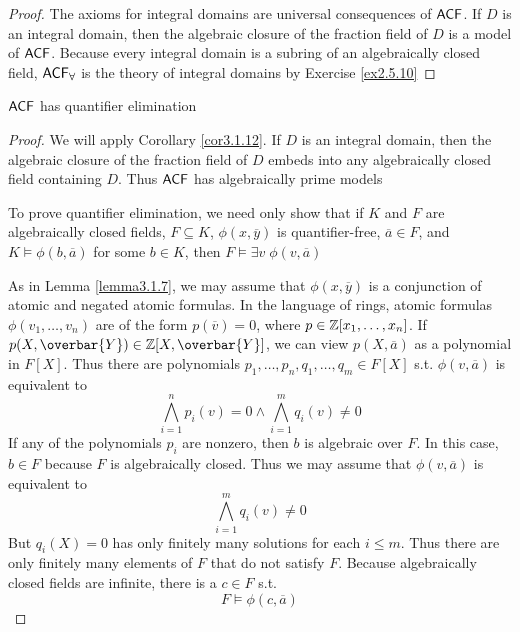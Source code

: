 \documentclass[11pt]{article}
\begin{document}
\begin{proof}
The axioms for integral domains are universal consequences of \(\textsf{ACF}\). If \(D\)
is an integral domain, then the algebraic closure of the fraction field of
\(D\) is a model of \(\textsf{ACF}\). Because every integral domain is a subring of an
algebraically closed field, \(\textsf{ACF}_\forall\) is the theory of integral
domains by Exercise \ref{ex2.5.10}
\end{proof}

\begin{theorem}[]
\label{thm3.2.2}
\(\textsf{ACF}\) has quantifier elimination
\end{theorem}

\begin{proof}
We will apply Corollary \ref{cor3.1.12}. If \(D\) is an integral domain, then
the algebraic closure of the fraction field of \(D\) embeds into any
algebraically closed field containing \(D\). Thus \(\textsf{ACF}\) has algebraically prime
models

To prove quantifier elimination, we need only show that if \(K\) and \(F\) are
algebraically closed fields, \(F\subseteq K\), \(\phi(x,\overbar{y})\) is
quantifier-free, \(\overbar{a}\in F\), and \(K\vDash\phi(b,\overbar{a})\)
for some \(b\in K\), then \(F\vDash\exists v\;\phi(v,\overbar{a})\)

As in Lemma \ref{lemma3.1.7}, we may assume that \(\phi(x,\overbar{y})\) is a
conjunction of atomic and negated atomic formulas. In the language of rings,
atomic formulas \(\phi(v_1,\dots,v_n)\) are of the form \(p(\overbar{v})=0\),
where \(p\in\mathbb{Z}[x_1,\dots,x_n]\). If \(p(X,\overbar{Y})\in\Z[X,\overbar{Y}]\),
we can view \(p(X,\overbar{a})\) as a polynomial in \(F[X]\). Thus there are
polynomials \(p_1,\dots,p_n,q_1,\dots,q_m\in F[X]\) s.t.
\(\phi(v,\overbar{a})\) is equivalent to
\begin{equation*}
\bigwedge_{i=1}^np_i(v)=0\wedge
\bigwedge_{i=1}^mq_i(v)\neq0
\end{equation*}
If any of the polynomials \(p_i\) are nonzero, then \(b\) is algebraic over
\(F\). In this case, \(b\in F\) because \(F\) is algebraically closed. Thus
we may assume that \(\phi(v,\overbar{a})\) is equivalent to
\begin{equation*}
\bigwedge_{i=1}^mq_i(v)\neq0
\end{equation*}
But  \(q_i(X)=0\) has only finitely many solutions for each \(i\le m\). Thus
there are only finitely many elements of \(F\) that do not satisfy \(F\).
Because algebraically closed fields are infinite, there is a \(c\in F\) s.t.
\begin{equation*}
F\vDash\phi(c,\overbar{a})
\end{equation*}
\end{proof}
\end{document}

